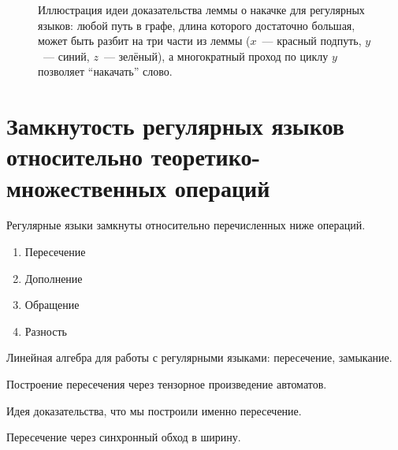 \begin{figure}
    \caption{Иллюстрация идеи доказательства леммы о накачке для регулярных языков: любой путь в графе, длина которого достаточно большая, может быть разбит на три части из леммы ($x$~--- красный подпуть, $y$~--- синий, $z$~--- зелёный), а многократный проход по циклу $y$ позволяет \enquote{накачать} слово.}
    \label{fig:reg_lang_pumping_lemma}
    \begin{center}
    \end{center}

\end{figure}


\section{Замкнутость регулярных языков относительно теоретико-множественных операций}

\begin{theorem}
    Регулярные языки замкнуты относительно перечисленных ниже операций.
    \begin{enumerate}
        \item Пересечение
        \item Дополнение
        \item Обращение
        \item Разность
    \end{enumerate}
\end{theorem}

Линейная алгебра для работы с регулярными языками: пересечение, замыкание.

Построение пересечения через тензорное произведение автоматов.

Идея доказательства, что мы построили именно пересечение.

Пересечение через синхронный обход в ширину.

%
%

